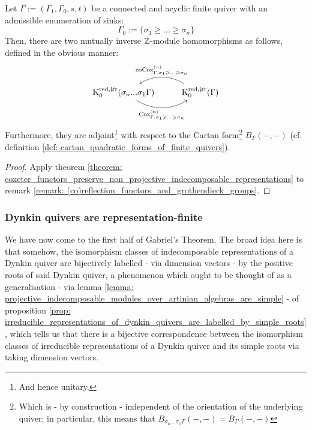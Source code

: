             \begin{corollary} \label{coro: nth_coxeter_functors_and_grothendieck_groups}
                Let $\Gamma := (\Gamma_1, \Gamma_0, s, t)$ be a connected and acyclic finite quiver with an admissible enumeration of sinks:
                    $$\Gamma_0 := \{\sigma_1 \geq ... \geq \sigma_n\}$$
                Then, there are two mutually inverse $\mathbb{Z}$-module homomorphisms as follows, defined in the obvious manner:
                    $$
                        \begin{tikzcd}
                        	{\K_0^{\red, \not \irr}(\sigma_n ... \sigma_1 \Gamma)} & {\K_0^{\red, \not \irr}(\Gamma)}
                        	\arrow[""{name=0, anchor=center, inner sep=0}, "{\Cox_{\Gamma, \sigma_1 \geq ...\geq \sigma_n}^{(n)}}"', bend right, from=1-1, to=1-2]
                        	\arrow[""{name=1, anchor=center, inner sep=0}, "{\co\Cox_{\Gamma, \sigma_1 \geq ...\geq \sigma_n}^{(n)}}"', bend right, from=1-2, to=1-1]
                        \end{tikzcd}
                    $$
                Furthermore, they are adjoint\footnote{And hence unitary.} with respect to the Cartan form\footnote{Which is - by construction - independent of the orientation of the underlying quiver; in particular, this means that $B_{\sigma_n ... \sigma_1 \Gamma}(-, -) = B_{\Gamma}(-, -)$} $B_{\Gamma}(-, -)$ (cf. definition \ref{def: cartan_quadratic_forms_of_finite_quivers}).
            \end{corollary}
                \begin{proof}
                    Apply theorem \ref{theorem: coxeter_functors_preserve_non_projective_indecomposable_representations} to remark \ref{remark: (co)reflection_functors_and_grothendieck_groups}. 
                \end{proof}
            
        \subsubsection{Dynkin quivers are representation-finite}
            We have now come to the first half of Gabriel's Theorem. The broad idea here is that somehow, the isomorphism classes of indecomposable representations of a Dynkin quiver are bijectively labelled - via dimension vectors - by the positive roots of said Dynkin quiver, a phenomenon which ought to be thought of as a generalisation - via lemma \ref{lemma: projective_indecomposable_modules_over_artinian_algebras_are_simple} - of proposition \ref{prop: irreducible_representations_of_dynkin_quivers_are_labelled_by_simple_roots}, which tells us that there is a bijective correspondence between the isomorphism classes of irreducible representations of a Dynkin quiver and its simple roots via taking dimension vectors. 
            
